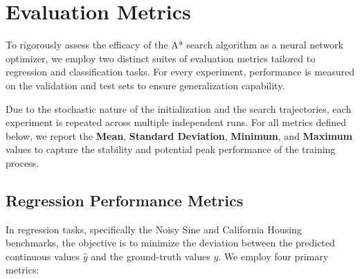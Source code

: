 \chapter{Evaluation Metrics}
\label{chap:metrics}

To rigorously assess the efficacy of the A* search algorithm as a neural network optimizer, we employ two distinct suites of evaluation metrics tailored to regression and classification tasks. For every experiment, performance is measured on the validation and test sets to ensure generalization capability.

Due to the stochastic nature of the initialization and the search trajectories, each experiment is repeated across multiple independent runs. For all metrics defined below, we report the \textbf{Mean}, \textbf{Standard Deviation}, \textbf{Minimum}, and \textbf{Maximum} values to capture the stability and potential peak performance of the training process.


\section{Regression Performance Metrics}
In regression tasks, specifically the Noisy Sine and California Housing benchmarks, the objective is to minimize the deviation between the predicted continuous values $\hat{y}$ and the ground-truth values $y$. We employ four primary metrics:

